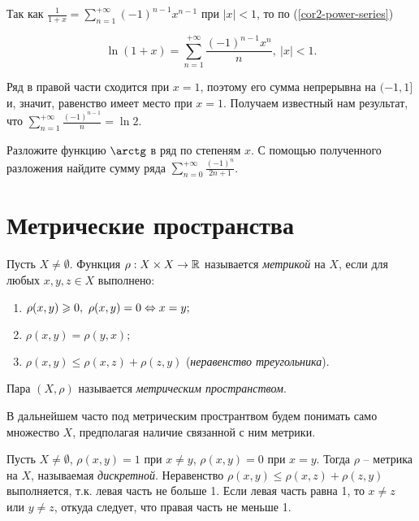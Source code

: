 \begin{example}
    Так как $\frac{1}{1 + x} = \sum_{n = 1}^{+\infty} (-1)^{n - 1}x^{n - 1}$ при $|x| < 1$, то по (\ref{cor2-power-series})
    
    \[\ln(1 + x) = \sum_{n = 1}^{+\infty}\frac{(-1)^{n - 1} x^{n}}{n}, \ |x| < 1.\]

    Ряд в правой части сходится при $x = 1$, поэтому его сумма непрерывна на $(-1, 1]$ и, значит, равенство имеет место при $x = 1$. Получаем известный нам результат, что $\sum_{n = 1}^{+\infty}\frac{(-1)^{n - 1}}{n} = \ln 2$.
\end{example}

\begin{problem}
    Разложите функцию $\arctg$ в ряд по степеням $x$. С помощью полученного разложения найдите сумму ряда $\sum_{n = 0}^{+\infty} \frac{(-1)^{n}}{2n + 1}$.
\end{problem}

\section{Метрические пространства}

\begin{definition}
    Пусть $X \not= \emptyset$. Функция $\rho: X \times X \to \mathbb{R}$ называется \textit{метрикой} на $X$, если для любых $x, y, z \in X$ выполнено:
    
    \begin{enumerate}
        \item $\rho(x, y) \geqslant 0, \ \rho(x, y) = 0 \Leftrightarrow x = y;$
        \item $\rho(x, y) = \rho(y, x);$
        \item $\rho(x, y) \leq \rho(x, z) + \rho(z, y)$ (\textit{неравенство треугольника}).
    \end{enumerate}

    Пара $(X, \rho)$ называется \textit{метрическим пространством}.
\end{definition}

В дальнейшем часто под метрическим пространтвом будем понимать само множество $X$, предполагая наличие связанной с ним метрики.

\begin{example}
    Пусть $X \not= \emptyset$, $\rho(x, y) = 1$ при $x \neq y$, $\rho(x, y) = 0$ при $x = y$. Тогда $\rho$ -- метрика на $X$, называемая \textit{дискретной}. Неравенство $\rho(x, y) \leq \rho(x, z) + \rho(z, y)$ выполняется, т.к. левая часть не больше 1. Если левая часть равна 1, то $x \neq z$ или $y \neq z$, откуда следует, что правая часть не меньше 1.
\end{example}


